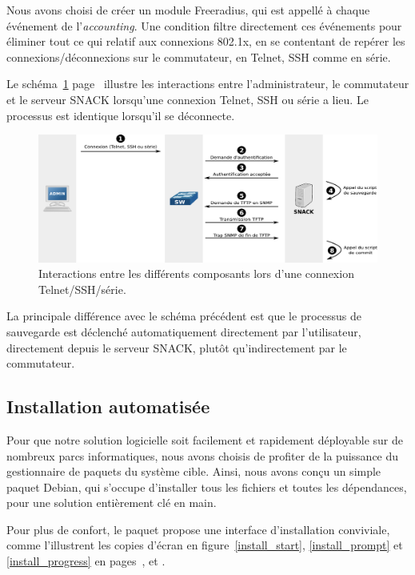 Nous avons choisi de créer un module Freeradius, qui est appellé à chaque événement de l'\emph{accounting}. Une condition filtre directement ces événements pour éliminer tout ce qui relatif aux connexions 802.1x, en se contentant de repérer les connexions/déconnexions sur le commutateur, en Telnet, SSH comme en série.

Le schéma~\ref{schema_auth} page~\pageref{schema_auth} illustre les interactions entre l'administrateur, le commutateur et le serveur SNACK lorsqu'une connexion Telnet, SSH ou série a lieu. Le processus est identique lorsqu'il se déconnecte.

\begin{figure}[!h]
	\begin{center}
	    \includegraphics[width=\textwidth]{img/auth.pdf}
	\end{center}
	\caption{Interactions entre les différents composants lors d'une connexion Telnet/SSH/série.}
	\label{schema_auth}
\end{figure}

La principale différence avec le schéma précédent est que le processus de sauvegarde est déclenché automatiquement directement par l'utilisateur, directement depuis le serveur SNACK, plutôt qu'indirectement par le commutateur.

\subsection{Installation automatisée}

Pour que notre solution logicielle soit facilement et rapidement déployable sur de nombreux parcs informatiques, nous avons choisis de profiter de la puissance du gestionnaire de paquets du système cible. Ainsi, nous avons conçu un simple paquet Debian, qui s'occupe d'installer tous les fichiers et toutes les dépendances, pour une solution entièrement clé en main.

Pour plus de confort, le paquet propose une interface d'installation conviviale, comme l'illustrent les copies d'écran en figure~\ref{install_start}, \ref{install_prompt} et \ref{install_progress} en pages~\pageref{install_start}, \pageref{install_prompt} et \pageref{install_progress}.

